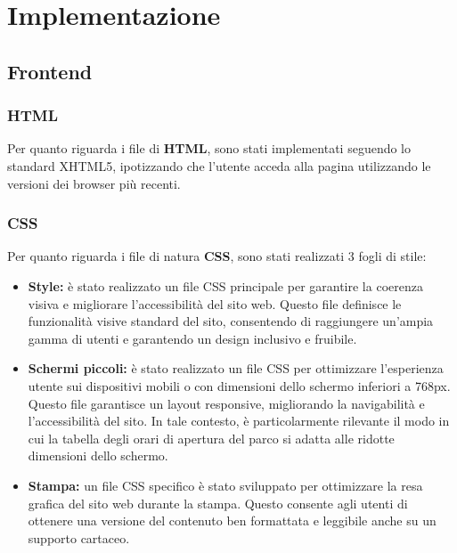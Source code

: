 \section{Implementazione}
\subsection{Frontend}
\subsubsection{HTML}
Per quanto riguarda i file di \textbf{HTML}, sono stati implementati seguendo lo standard XHTML5, ipotizzando che l'utente acceda alla pagina utilizzando le versioni dei browser più recenti.

\subsubsection{CSS}
Per quanto riguarda i file di natura \textbf{CSS}, sono stati realizzati 3 fogli di stile:
\begin{itemize}
    \item \textbf{Style:} è stato realizzato un file CSS principale per garantire la coerenza visiva e migliorare l'accessibilità del sito web. Questo file definisce le funzionalità visive standard del sito, consentendo di raggiungere un'ampia gamma di utenti e garantendo un design inclusivo e fruibile.
    \item \textbf{Schermi piccoli:} è stato realizzato un file CSS per ottimizzare l'esperienza utente sui dispositivi mobili o con dimensioni dello schermo inferiori a 768px. Questo file garantisce un layout responsive, migliorando la navigabilità e l'accessibilità del sito. In tale contesto, è particolarmente rilevante il modo in cui la tabella degli orari di apertura del parco si adatta alle ridotte dimensioni dello schermo.
    \item \textbf{Stampa:} un file CSS specifico è stato sviluppato per ottimizzare la resa grafica del sito web durante la stampa. Questo consente agli utenti di ottenere una versione del contenuto ben formattata e leggibile anche su un supporto cartaceo.
\end{itemize}


